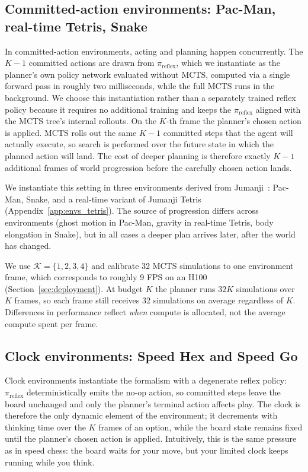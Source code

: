 \documentclass{article}
\newcommand{\Kset}{\mathcal{K}}
\begin{document}
\subsection{Committed-action environments: Pac-Man, real-time Tetris, Snake}
\label{sec:committed}

In committed-action environments, acting and planning happen
concurrently.
The $K-1$ committed actions are drawn from $\pi_{\mathrm{reflex}}$,
which we instantiate as the planner's own policy network evaluated
without MCTS, computed via a single forward pass in roughly two
milliseconds, while the full MCTS runs in the background.
We choose this instantiation rather than a separately trained reflex
policy because it requires no additional training and keeps the
$\pi_{\mathrm{reflex}}$ aligned with the MCTS tree's internal rollouts.
On the $K$-th frame the planner's chosen action is applied. MCTS rolls out the same $K{-}1$ committed steps that the
agent will actually execute, so search is performed over the future
state in which the planned action will land.
The cost of deeper planning is therefore exactly $K{-}1$ additional
frames of world progression before the carefully chosen action
lands.

We instantiate this setting in three environments derived from
Jumanji~\citep{bonnet2024jumanji}: Pac-Man, Snake, and a real-time
variant of Jumanji Tetris (Appendix~\ref{app:envs_tetris}).
The source of progression differs across environments (ghost motion
in Pac-Man, gravity in real-time Tetris, body elongation in Snake),
but in all cases a deeper plan arrives later, after the world has
changed.

We use $\Kset = \{1, 2, 3, 4\}$ and calibrate 32 MCTS simulations to
one environment frame, which corresponds to roughly 9 FPS on an H100
(Section~\ref{sec:deployment}).
At budget $K$ the planner runs $32K$ simulations over $K$
frames, so each frame still receives 32 simulations on average
regardless of $K$.
Differences in performance reflect \emph{when} compute is allocated,
not the average compute spent per frame.

\subsection{Clock environments: Speed Hex and Speed Go}
\label{sec:clock}

Clock environments instantiate the formalism with a degenerate
reflex policy: $\pi_{\mathrm{reflex}}$ deterministically emits the
no-op action, so committed steps leave the board unchanged and only
the planner's terminal action affects play.
The clock is therefore the only dynamic element of the environment;
it decrements with thinking time over the $K$ frames of an option,
while the board state remains fixed until the planner's chosen
action is applied.
Intuitively, this is the same pressure as in speed chess: the board
waits for your move, but your limited clock keeps running while you
think.
\end{document}
